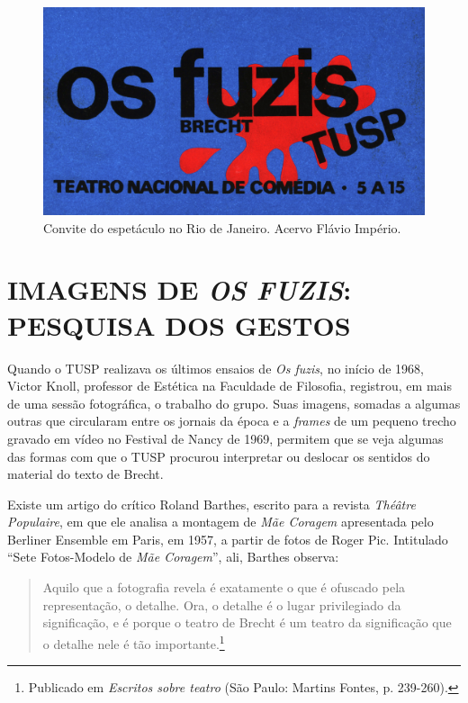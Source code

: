 \begin{figure}
\includegraphics[width=\columnwidth]{./media/IMAGEM23.png}
\caption{Convite do espetáculo no Rio de Janeiro. Acervo Flávio Império.}
\end{figure}

\chapter{IMAGENS DE \textit{OS FUZIS}: PESQUISA DOS GESTOS}

Quando o TUSP realizava os últimos ensaios de \textit{Os fuzis}, no início
de 1968, Victor Knoll, professor de Estética na Faculdade de Filosofia,
registrou, em mais de uma sessão fotográfica, o trabalho do grupo. Suas
imagens, somadas a algumas outras que circularam entre os jornais da
época e a \textit{frames} de um pequeno trecho gravado em vídeo no Festival
de Nancy de 1969, permitem que se veja algumas das formas com que o TUSP
procurou interpretar ou deslocar os sentidos do material do texto de
Brecht.

Existe um artigo do crítico Roland Barthes, escrito para a revista
\textit{Théâtre Populaire}, em que ele analisa a montagem de \textit{Mãe
Coragem} apresentada pelo Berliner Ensemble em Paris, em 1957, a partir
de fotos de Roger Pic. Intitulado “Sete Fotos-Modelo de \textit{Mãe
Coragem}”, ali, Barthes observa:

\begin{quote}
Aquilo que a fotografia revela é exatamente o que é ofuscado pela
representação, o detalhe. Ora, o detalhe é o lugar privilegiado da
significação, e é porque o teatro de Brecht é um teatro da significação
que o detalhe nele é tão importante.\footnote{Publicado em \textit{Escritos
  sobre teatro} (São Paulo: Martins Fontes, p. 239-260).}
\end{quote}

